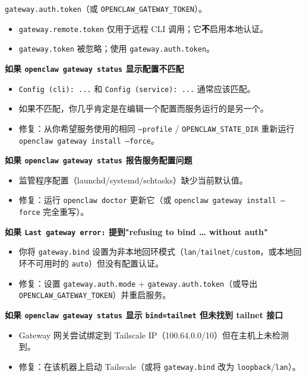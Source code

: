\texttt{gateway.auth.token}（或 \texttt{OPENCLAW\_GATEWAY\_TOKEN}）。
\begin{itemize}
  \item \texttt{gateway.remote.token} 仅用于远程 CLI 调用；它\textbf{不}启用本地认证。
  \item \texttt{gateway.token} 被忽略；使用 \texttt{gateway.auth.token}。
\end{itemize}


\textbf{如果 \texttt{openclaw gateway status} 显示配置不匹配}

\begin{itemize}
  \item \texttt{Config (cli): ...} 和 \texttt{Config (service): ...} 通常应该匹配。
  \item 如果不匹配，你几乎肯定是在编辑一个配置而服务运行的是另一个。
  \item 修复：从你希望服务使用的相同 \texttt{--profile} / \texttt{OPENCLAW\_STATE\_DIR} 重新运行 \texttt{openclaw gateway install --force}。
\end{itemize}


\textbf{如果 \texttt{openclaw gateway status} 报告服务配置问题}

\begin{itemize}
  \item 监管程序配置（launchd/systemd/schtasks）缺少当前默认值。
  \item 修复：运行 \texttt{openclaw doctor} 更新它（或 \texttt{openclaw gateway install --force} 完全重写）。
\end{itemize}


\textbf{如果 \texttt{Last gateway error:} 提到"refusing to bind … without auth"}

\begin{itemize}
  \item 你将 \texttt{gateway.bind} 设置为非本地回环模式（\texttt{lan}/\texttt{tailnet}/\texttt{custom}，或本地回环不可用时的 \texttt{auto}）但没有配置认证。
  \item 修复：设置 \texttt{gateway.auth.mode} + \texttt{gateway.auth.token}（或导出 \texttt{OPENCLAW\_GATEWAY\_TOKEN}）并重启服务。
\end{itemize}


\textbf{如果 \texttt{openclaw gateway status} 显示 \texttt{bind=tailnet} 但未找到 tailnet 接口}

\begin{itemize}
  \item Gateway 网关尝试绑定到 Tailscale IP（100.64.0.0/10）但在主机上未检测到。
  \item 修复：在该机器上启动 Tailscale（或将 \texttt{gateway.bind} 改为 \texttt{loopback}/\texttt{lan}）。
\end{itemize}


